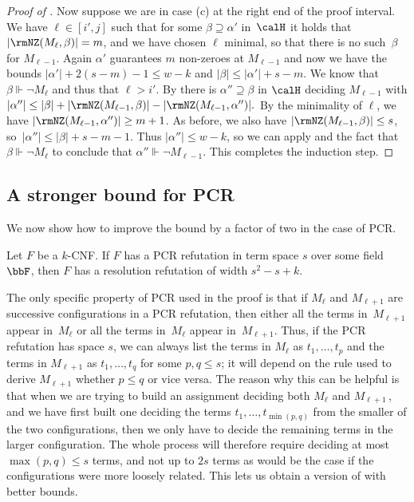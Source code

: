 \begin{proof}[Proof of ]
Now suppose we are in case (c) at the right end of the proof interval.
We have  $\ell \in [i',j]$ such that for some $\beta \supseteq \alpha'$ in~$\calH$
it holds that $|\rmNZ(M_{\ell}, \beta)| = m$, 
and we have chosen $\ell$ minimal, so that there is no such~$\beta$ for $M_{\ell-1}$. 
Again $\alpha'$ guarantees $m$ non-zeroes at $M_{\ell-1}$ and now
we have the bounds
$|\alpha'| + 2(s-m)-1 \le w - k$ and $|\beta| \le |\alpha'|+s-m$.
We know that~$\beta \Vdash \neg M_{\ell}$ and thus that $\ell > i'$.
By  there is $\alpha'' \supseteq \beta$ in $\calH$
deciding $M_{\ell-1}$ with 
$
|\alpha''| \le |\beta|+|\rmNZ(M_{\ell-1},\beta)|-|\rmNZ(M_{\ell-1}, \alpha'')|.
$
By the minimality of $\ell$, we have $|\rmNZ(M_{\ell-1}, \alpha'')| \ge m+1$.
As before, we also have $|\rmNZ(M_{\ell-1}, \beta)| \le s$, 
so~$|\alpha''| \le |\beta|+s-m-1$.
Thus $|\alpha''| \le w-k$, so we can apply 
and the fact that $\beta \Vdash \neg M_\ell$ to conclude that $\alpha'' \Vdash \neg M_{\ell-1}$.
This completes the induction step.
\end{proof}



\subsection{A stronger bound for PCR}\label{sec:stronger_PCR}


We now show how to improve the bound 
by a factor of two in the case of PCR.

\begin{theorem}\label{thm:main}
Let $F$ be a $k$-CNF. If $F$ has a PCR refutation in term space $s$ 
over some field~$\bbF$, 
then $F$ has a resolution refutation of width $s^2 - s + k$.
\end{theorem}

The only specific property of PCR used in the proof is that
if $M_\ell$ and $M_{\ell+1}$ are successive configurations in a PCR refutation,
then either all the terms in~$M_{\ell+1}$ appear in~$M_\ell$ or all the terms in~$M_\ell$ appear in~$M_{\ell+1}$.
Thus, if the PCR refutation has space $s$, we can always list the terms 
in $M_\ell$ as $t_1, \dots, t_p$ and the terms in $M_{\ell+1}$ as $t_1, \dots, t_q$ for some $p,q \le s$;
it will depend on the rule used to derive $M_{\ell+1}$ whether $p \le q$ or vice versa.
The reason why this can be helpful is that when we are trying to build an assignment
deciding both $M_\ell$ and $M_{\ell+1}$\,, and we have first built one deciding
the terms $t_1, \dots, t_{\min(p,q)}$ from the smaller of the two configurations, 
then we only have to decide the remaining terms in the larger configuration.
The whole process will therefore require deciding at most $\max(p,q) \le s$ terms,
and not up to $2s$ terms as would be the case if the configurations were more loosely related. 
This lets us obtain a version of  with better bounds.

